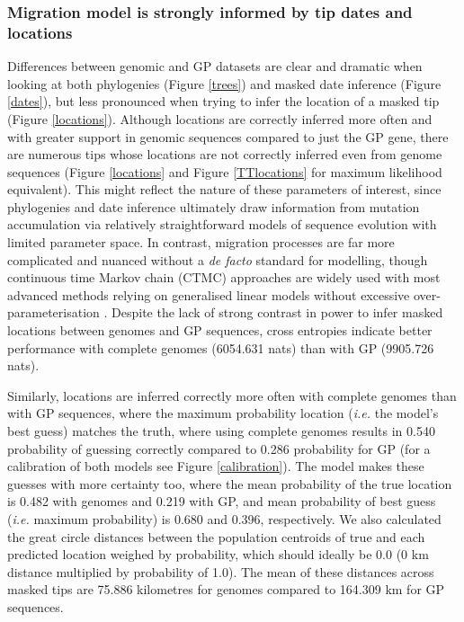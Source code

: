 \documentclass[11pt,oneside,letterpaper]{article}
\begin{document}
\subsubsection*{Migration model is strongly informed by tip dates and locations}

Differences between genomic and GP datasets are clear and dramatic when looking at both phylogenies (Figure \ref{trees}) and masked date inference (Figure \ref{dates}), but less pronounced when trying to infer the location of a masked tip (Figure \ref{locations}).
Although locations are correctly inferred more often and with greater support in genomic sequences compared to just the GP gene, there are numerous tips whose locations are not correctly inferred even from genome sequences (Figure \ref{locations} and Figure \ref{TTlocations} for maximum likelihood equivalent).
This might reflect the nature of these parameters of interest, since phylogenies and date inference ultimately draw information from mutation accumulation via relatively straightforward models of sequence evolution with limited parameter space.
In contrast, migration processes are far more complicated and nuanced without a \textit{de facto} standard for modelling, though continuous time Markov chain (CTMC) approaches are widely used \citep{lemey_bayesian_2009} with most advanced methods relying on generalised linear models without excessive over-parameterisation \citep{faria_simultaneously_2013,lemey_unifying_2014,dudas_virus_2017}.
Despite the lack of strong contrast in power to infer masked locations between genomes and GP sequences, cross entropies indicate better performance with complete genomes (6054.631 nats) than with GP (9905.726 nats).

Similarly, locations are inferred correctly more often with complete genomes than with GP sequences, where the maximum probability location (\textit{i.e.} the model's best guess) matches the truth, where using complete genomes results in 0.540 probability of guessing correctly compared to 0.286 probability for GP (for a calibration of both models see Figure \ref{calibration}).
The model makes these guesses with more certainty too, where the mean probability of the true location is 0.482 with genomes and 0.219 with GP, and mean probability of best guess (\textit{i.e.} maximum probability) is 0.680 and 0.396, respectively.
We also calculated the great circle distances between the population centroids of true and each predicted location weighed by probability, which should ideally be 0.0 (0 km distance multiplied by probability of 1.0).
The mean of these distances across masked tips are 75.886 kilometres for genomes compared to 164.309 km for GP sequences.
\end{document}
